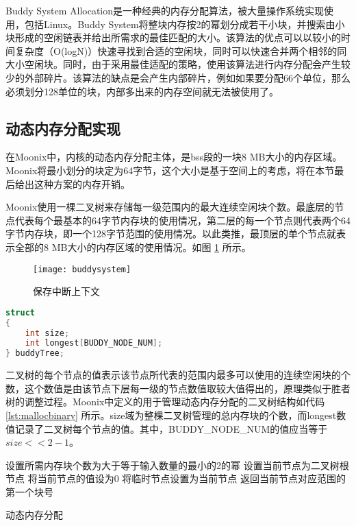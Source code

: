 Buddy System Allocation是一种经典的内存分配算法\cite{DBLP:journals/acta/BrodalDM05}，被大量操作系统实现使用，包括Linux。Buddy System将整块内存按2的幂划分成若干小块，并搜索由小块形成的空闲链表并给出所需求的最佳匹配的大小。该算法的优点可以以较小的时间复杂度（O(logN)）快速寻找到合适的空闲块，同时可以快速合并两个相邻的同大小空闲块。同时，由于采用最佳适配的策略，使用该算法进行内存分配会产生较少的外部碎片。该算法的缺点是会产生内部碎片，例如如果要分配66个单位，那么必须划分128单位的块，内部多出来的内存空间就无法被使用了。

\subsection{动态内存分配实现}

在Moonix中，内核的动态内存分配主体，是bss段的一块8 MB大小的内存区域。Moonix将最小划分的块定为64字节，这个大小是基于空间上的考虑，将在本节最后给出这种方案的内存开销。

Moonix使用一棵二叉树来存储每一级范围内的最大连续空闲块个数。最底层的节点代表每个最基本的64字节内存块的使用情况，第二层的每一个节点则代表两个64字节内存块，即一个128字节范围的使用情况。以此类推，最顶层的单个节点就表示全部的8 MB大小的内存区域的使用情况。如图 \ref{pic:buddysystem} 所示。

\begin{figure}[htpb]
	\centering
	\texttt{[image: buddysystem]}
	\setlength{\abovecaptionskip}{2pt}
	\caption{保存中断上下文}
	\label{pic:buddysystem}
\end{figure}


\begin{minipage}[c]{0.95\textwidth}
\begin{lstlisting}[language={C}, caption={动态内存分配管理二叉树}, label={lst:mallocbinary}]
struct
{
	int size;
	int longest[BUDDY_NODE_NUM];
} buddyTree;
\end{lstlisting}
\end{minipage}

二叉树的每个节点的值表示该节点所代表的范围内最多可以使用的连续空闲块的个数，这个数值是由该节点下层每一级的节点数值取较大值得出的，原理类似于胜者树的调整过程。Moonix中定义的用于管理动态内存分配的二叉树结构如代码 \ref{lst:mallocbinary} 所示。size域为整棵二叉树管理的总内存块的个数，而longest数值记录了二叉树每个节点的值。其中，BUDDY\_NODE\_NUM的值应当等于$size<<2-1$。\\

\begin{algorithm}[H]
	
	设置所需内存块个数为大于等于输入数量的最小的2的幂\;
	设置当前节点为二叉树根节点\;
	将当前节点的值设为0\;
	将临时节点设置为当前节点\;
	返回当前节点对应范围的第一个块号\;
	\caption{动态内存分配}
	\label{alg:kalloc}
\end{algorithm}

